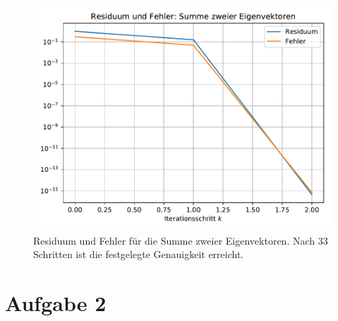 \documentclass[10pt,a4paper]{article}
\begin{document}
\begin{figure}[H]
  \centering
  \includegraphics[width=.85\textwidth]{../figures/residuum_and_errors_summe_eigenvektoren.pdf}
  \caption{
    Residuum und Fehler für die Summe zweier Eigenvektoren.
    Nach \num{33} Schritten ist die festgelegte Genauigkeit erreicht.
  }
  \label{fig:summe}
\end{figure}

\section{Aufgabe 2}
\end{document}
